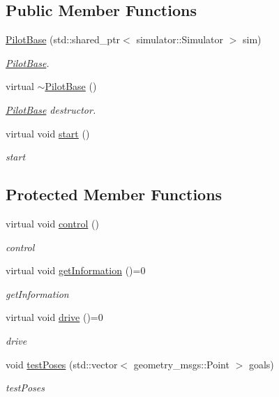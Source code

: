 \subsection*{Public Member Functions}
\begin{DoxyCompactItemize}
\item 
\hyperlink{classPilotBase_ad7443e4d4655d319c2ae5a6251b294f5}{Pilot\+Base} (std\+::shared\+\_\+ptr$<$ simulator\+::\+Simulator $>$ sim)
\begin{DoxyCompactList}\small\item\em \hyperlink{classPilotBase}{Pilot\+Base}. \end{DoxyCompactList}\item 
\mbox{\label{classPilotBase_a510bddf81ba43b027f1655f60998316a}} 
virtual \hyperlink{classPilotBase_a510bddf81ba43b027f1655f60998316a}{$\sim$\+Pilot\+Base} ()
\begin{DoxyCompactList}\small\item\em \hyperlink{classPilotBase}{Pilot\+Base} destructor. \end{DoxyCompactList}\item 
virtual void \hyperlink{classPilotBase_a3480ea2023ca1459b32b79abf8a3400d}{start} ()
\begin{DoxyCompactList}\small\item\em start \end{DoxyCompactList}\end{DoxyCompactItemize}
\subsection*{Protected Member Functions}
\begin{DoxyCompactItemize}
\item 
virtual void \hyperlink{classPilotBase_a611edd0c1a501e1bb6722f5b62e95d6b}{control} ()
\begin{DoxyCompactList}\small\item\em control \end{DoxyCompactList}\item 
virtual void \hyperlink{classPilotBase_a0c3cfd1b468842734e3706ff8dea133b}{get\+Information} ()=0
\begin{DoxyCompactList}\small\item\em get\+Information \end{DoxyCompactList}\item 
virtual void \hyperlink{classPilotBase_ad4a3db2cf9d40b5936dba864977eee95}{drive} ()=0
\begin{DoxyCompactList}\small\item\em drive \end{DoxyCompactList}\item 
void \hyperlink{classPilotBase_a9245c4ef3c141166169a1f43aa61af3a}{test\+Poses} (std\+::vector$<$ geometry\+\_\+msgs\+::\+Point $>$ goals)
\begin{DoxyCompactList}\small\item\em test\+Poses \end{DoxyCompactList}\end{DoxyCompactItemize}
